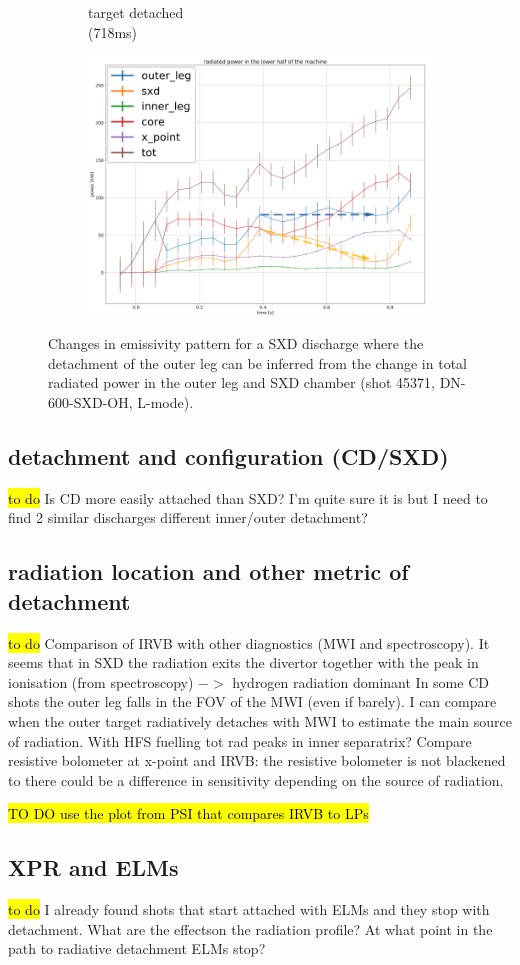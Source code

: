 \begin{figure}
\begin{subfigure}{0.21\textwidth}
         \caption{target detached\\(718ms)}
         \label{fig:45371_2}
     \end{subfigure}
     \hfill
     \begin{subfigure}{0.5\textwidth}
         \centering
         \includegraphics[trim={0 0 0 0},clip,width=\textwidth]{Chapters/chapter2/figs/45371_3.png}
         \label{fig:45371_3}
     \end{subfigure}
    \caption{Changes in emissivity pattern for a SXD discharge where the detachment of the outer leg can be inferred from the change in total radiated power in the outer leg and SXD chamber (shot 45371, DN-600-SXD-OH, L-mode).}
    \label{fig:45371}
\end{figure}

\subsection{detachment and configuration (CD/SXD)}
\hl{to do}
Is CD more easily attached than SXD? I'm quite sure it is but I need to find 2 similar discharges
different inner/outer detachment?

\subsection{radiation location and other metric of detachment}
\hl{to do}
Comparison of IRVB with other diagnostics (MWI and spectroscopy). It seems that in SXD the radiation exits the divertor together with the peak in ionisation (from spectroscopy) $->$ hydrogen radiation dominant
In some CD shots the outer leg falls in the FOV of the MWI (even if barely). I can compare when the outer target radiatively detaches with MWI to estimate the main source of radiation.
With HFS fuelling tot rad peaks in inner separatrix?
Compare resistive bolometer at x-point and IRVB: the resistive bolometer is not blackened to there could be a difference in sensitivity depending on the source of radiation.

\hl{TO DO use the plot from PSI that compares IRVB to LPs}

\subsection{XPR and ELMs}
\hl{to do}
I already found shots that start attached with ELMs and they stop with detachment. What are the effectson the radiation profile? At what point in the path to radiative detachment ELMs stop?
